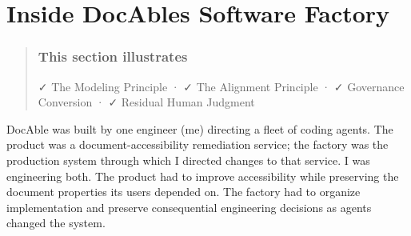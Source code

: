 


\chapter{Inside DocAble\textquotesingle s Software Factory}


\begin{quote}
\mbox{}%
\subsection{This section illustrates}\label{heading:illustrates}

✓ The Modeling Principle · ✓ The Alignment Principle · ✓ Governance Conversion · ✓ Residual Human Judgment
\end{quote}


DocAble was built by one engineer (me) directing a fleet of coding agents. The product was a document-accessibility remediation service; the factory was the production system through which I directed changes to that service. I was engineering both. The product had to improve accessibility while preserving the document properties its users depended on. The factory had to organize implementation and preserve consequential engineering decisions as agents changed the system.

